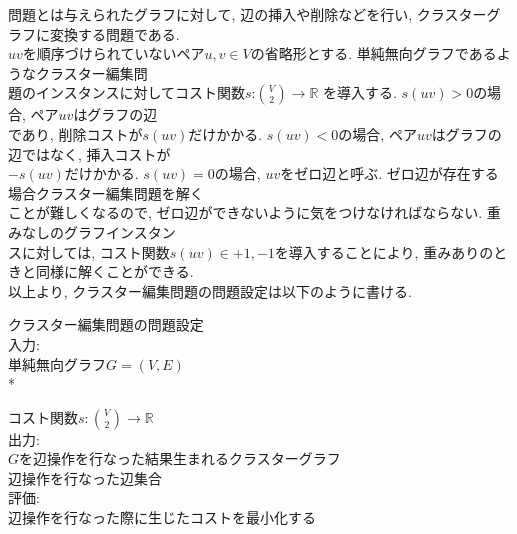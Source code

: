 \documentclass[10.5,a4paper,titlepage]{bxjsarticle}
\begin{document}
問題とは与えられたグラフに対して, 辺の挿入や削除などを行い, クラスターグラフに変換する問題である.\\


$uv$を順序づけられていないペア${u,v} \in V$の省略形とする. 単純無向グラフであるようなクラスター編集問\\

題のインスタンスに対してコスト関数$s$:$\binom{V}{2} \rightarrow \mathbb{R}$
を導入する. $s(uv)>0$の場合, ペア$uv$はグラフの辺\\

であり, 削除コストが$s(uv)$だけかかる. $s(uv)<0$の場合, ペア$uv$はグラフの辺ではなく, 挿入コストが\\

$-s(uv)$だけかかる.
$s(uv)=0$の場合, $uv$をゼロ辺と呼ぶ. ゼロ辺が存在する場合クラスター編集問題を解く\\

ことが難しくなるので, ゼロ辺ができないように気をつけなければならない.
重みなしのグラフインスタン\\

スに対しては, コスト関数$s(uv) \in {+1, -1}$を導入することにより, 重みありのときと同様に解くことができる.\\


以上より, クラスター編集問題の問題設定は以下のように書ける.\\

\begin{screen}
    クラスター編集問題の問題設定 \\

    入力: \\

    \hspace{15pt} 単純無向グラフ$G=(V,E)$ \\*

    \hspace{15pt} コスト関数$s: \binom{V}{2} \rightarrow \mathbb{R} $\\

    出力: \\

    \hspace{15pt} $G$を辺操作を行なった結果生まれるクラスターグラフ\\

    \hspace{15pt} 辺操作を行なった辺集合 \\

    評価: \\

    \hspace{15pt} 辺操作を行なった際に生じたコストを最小化する

\end{screen}
\\
\end{document}
